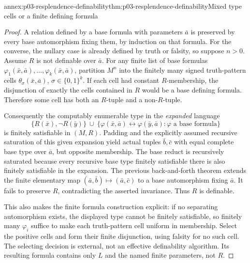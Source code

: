 \begin{annexitem}{annex:p03-resplendence-definability}{thm:p03-resplendence-definability}{Mixed type cells or a finite defining formula}
\begin{proof}
A relation defined by a base formula with parameters \(\bar a\) is
preserved by every base automorphism fixing them, by induction on that
formula. For the converse, the nullary case is already defined by truth
or falsity, so suppose \(n>0\). Assume \(R\) is not definable over
\(\bar a\). For any finite list of base formulas
\(\varphi_1(\bar x,\bar a),\ldots,\varphi_k(\bar x,\bar a)\),
partition \(M^n\) into the finitely many signed truth-pattern cells
\(\theta_\sigma(\bar x,\bar a)\), \(\sigma\in\{0,1\}^k\).
If each cell had constant \(R\)-membership, the disjunction of exactly
the cells contained in \(R\) would be a base defining formula. Therefore
some cell has both an \(R\)-tuple and a non-\(R\)-tuple.

Consequently the computably enumerable type in the \emph{expanded} language
\[
 \{R(\bar x),\neg R(\bar y)\}\ \cup\
 \{\varphi(\bar x,\bar a)\leftrightarrow\varphi(\bar y,\bar a):
                                       \varphi\text{ a base formula}\}
\]
is finitely satisfiable in \((M,R)\). Padding and the explicitly assumed
recursive saturation of this given expansion yield actual tuples
\(\bar b,\bar c\) with equal complete base type over \(\bar a\),
but opposite membership. The base reduct is recursively saturated because
every recursive base type finitely satisfiable there is also finitely
satisfiable in the expansion. The previous back-and-forth theorem extends
the finite elementary map \((\bar a,\bar b)\mapsto(\bar a,\bar c)\)
to a base automorphism fixing \(\bar a\). It fails to preserve \(R\),
contradicting the asserted invariance. Thus \(R\) is definable.

This also makes the finite formula construction explicit: if no separating
automorphism exists, the displayed type cannot be finitely satisfiable,
so finitely many \(\varphi_i\) suffice to make each truth-pattern cell
uniform in membership. Select the positive cells and form their finite
disjunction, using falsity for no such cell. The selecting decision is
external, not an effective definability algorithm. Its resulting formula
contains only \(L\) and the named finite parameters, not \(R\).
\end{proof}
\end{annexitem}

